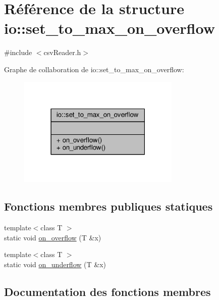 \hypertarget{structio_1_1set__to__max__on__overflow}{}\section{Référence de la structure io\+:\+:set\+\_\+to\+\_\+max\+\_\+on\+\_\+overflow}
\label{structio_1_1set__to__max__on__overflow}


{\ttfamily \#include $<$csv\+Reader.\+h$>$}



Graphe de collaboration de io\+:\+:set\+\_\+to\+\_\+max\+\_\+on\+\_\+overflow\+:\nopagebreak
\begin{figure}[H]
\begin{center}
\leavevmode
\includegraphics[width=219pt]{structio_1_1set__to__max__on__overflow__coll__graph}
\end{center}
\end{figure}
\subsection*{Fonctions membres publiques statiques}
\begin{DoxyCompactItemize}
\item 
{\footnotesize template$<$class T $>$ }\\static void \hyperlink{structio_1_1set__to__max__on__overflow_a770dee97a1ee55131163e6be8d4c0d9d}{on\+\_\+overflow} (T \&x)
\item 
{\footnotesize template$<$class T $>$ }\\static void \hyperlink{structio_1_1set__to__max__on__overflow_a812d316e2b23247df19ca83bfda90a59}{on\+\_\+underflow} (T \&x)
\end{DoxyCompactItemize}


\subsection{Documentation des fonctions membres}
\mbox{\label{structio_1_1set__to__max__on__overflow_a770dee97a1ee55131163e6be8d4c0d9d}} 
